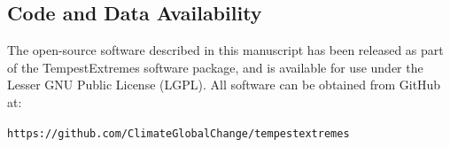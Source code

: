\documentclass[gmdd, hvmath, online]{copernicus_discussions}
\begin{document}
\subsection{Code and Data Availability}

The open-source software described in this manuscript has been released as part of the TempestExtremes software package, and is available for use under the Lesser GNU Public License (LGPL).  All software can be obtained from GitHub at:
\begin{center}
\texttt{https://github.com/ClimateGlobalChange/tempestextremes}
\end{center} 





\end{document}
